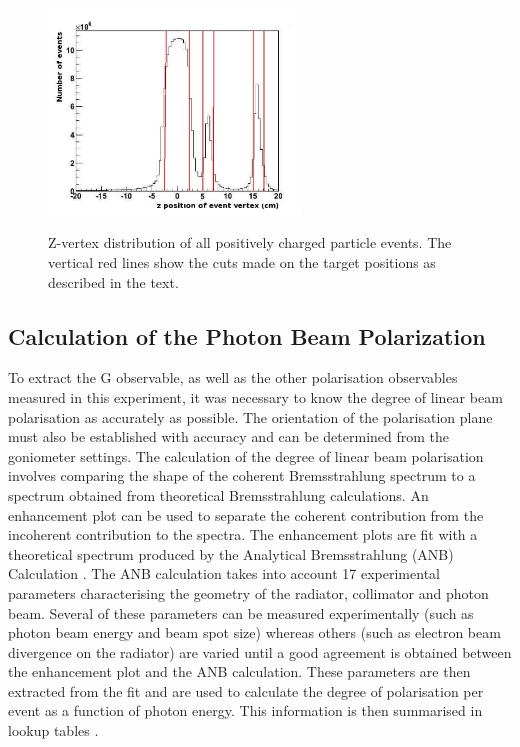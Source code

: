 \begin{figure}[htb]
  \begin{center}
    \includegraphics[width=0.6\textwidth]{figures/targets_pos.png} \\
    \caption{Z-vertex distribution of all positively charged particle events. The vertical red lines show the cuts made on the target positions as described in the text.}
    \label{fig:target_pos}
  \end{center}
\end{figure}



\subsection{Calculation of the Photon Beam Polarization}
To extract the G observable, as well as the other polarisation observables measured in this experiment, it was necessary to know the degree of linear beam polarisation as accurately as possible. The orientation of the polarisation plane must also be established with accuracy and can be determined from the goniometer settings. The calculation of the degree of linear beam polarisation involves comparing the shape of the coherent Bremsstrahlung spectrum to a spectrum obtained from theoretical Bremsstrahlung calculations. An enhancement plot can be used to separate the coherent contribution from the incoherent contribution to the spectra. The enhancement plots are fit with a theoretical spectrum produced by the Analytical Bremsstrahlung (ANB) Calculation \cite{Natter_2003}\cite{Sabin_2010}. The ANB calculation takes into account 17 experimental parameters characterising the geometry of the radiator, collimator and photon beam. Several of these parameters can be measured experimentally (such as photon beam energy and beam spot size) whereas others (such as electron beam divergence on the radiator) are varied until a good agreement is obtained between the enhancement plot and the ANB calculation. These parameters are then extracted from the fit and are used to calculate the degree of polarisation per event as a function of photon energy. This information is then summarised in lookup tables \cite{Anderson_table}.




